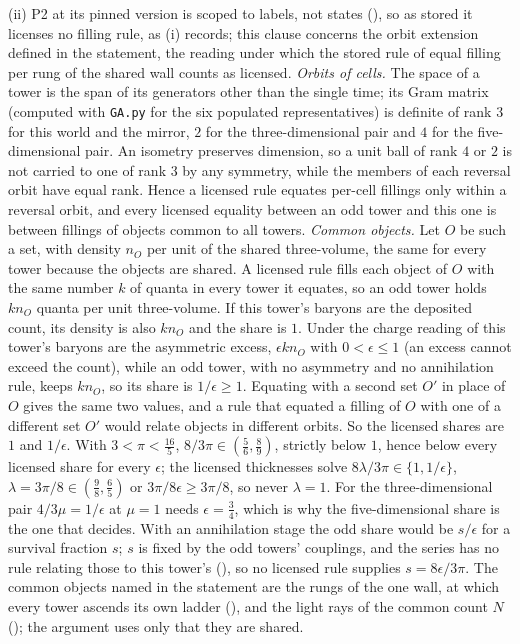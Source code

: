 (ii) P2 at its pinned version is scoped to labels, not states (), so as stored it licenses no filling rule, as (i) records; this clause concerns the orbit extension defined in the statement, the reading under which the stored rule of equal filling per rung of the shared wall counts as licensed. \emph{Orbits of cells.} The space of a tower is the span of its generators other than the single time; its Gram matrix (computed with \texttt{GA.py} for the six populated representatives) is definite of rank $3$ for this world and the mirror, $2$ for the three-dimensional pair and $4$ for the five-dimensional pair. An isometry preserves dimension, so a unit ball of rank $4$ or $2$ is not carried to one of rank $3$ by any symmetry, while the members of each reversal orbit have equal rank. Hence a licensed rule equates per-cell fillings only within a reversal orbit, and every licensed equality between an odd tower and this one is between fillings of objects common to all towers. \emph{Common objects.} Let $O$ be such a set, with density $n_{O}$ per unit of the shared three-volume, the same for every tower because the objects are shared. A licensed rule fills each object of $O$ with the same number $k$ of quanta in every tower it equates, so an odd tower holds $kn_{O}$ quanta per unit three-volume. If this tower's baryons are the deposited count, its density is also $kn_{O}$ and the share is $1$. Under the charge reading of  this tower's baryons are the asymmetric excess, $\epsilon kn_{O}$ with $0 < \epsilon \le 1$ (an excess cannot exceed the count), while an odd tower, with no asymmetry and no annihilation rule, keeps $kn_{O}$, so its share is $1/\epsilon \ge 1$. Equating with a second set $O'$ in place of $O$ gives the same two values, and a rule that equated a filling of $O$ with one of a different set $O'$ would relate objects in different orbits. So the licensed shares are $1$ and $1/\epsilon$. With $3 < \pi < \tfrac{16}{5}$, $8/3\pi \in (\tfrac56, \tfrac89)$, strictly below $1$, hence below every licensed share for every $\epsilon$; the licensed thicknesses solve $8\lambda/3\pi \in \{1, 1/\epsilon\}$, $\lambda = 3\pi/8 \in (\tfrac98, \tfrac65)$ or $3\pi/8\epsilon \ge 3\pi/8$, so never $\lambda = 1$. For the three-dimensional pair $4/3\mu = 1/\epsilon$ at $\mu = 1$ needs $\epsilon = \tfrac34$, which is why the five-dimensional share is the one that decides. With an annihilation stage the odd share would be $s/\epsilon$ for a survival fraction $s$; $s$ is fixed by the odd towers' couplings, and the series has no rule relating those to this tower's (), so no licensed rule supplies $s = 8\epsilon/3\pi$. The common objects named in the statement are the rungs of the one wall, at which every tower ascends its own ladder (), and the light rays of the common count $N$ (); the argument uses only that they are shared.

